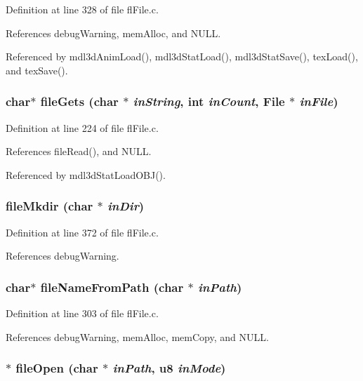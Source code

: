 Definition at line 328 of file fl\-File.c.

References debug\-Warning, mem\-Alloc, and NULL.

Referenced by mdl3d\-Anim\-Load(), mdl3d\-Stat\-Load(), mdl3d\-Stat\-Save(), tex\-Load(), and tex\-Save().
\subsubsection{\setlength{\rightskip}{0pt plus 5cm}char$\ast$ file\-Gets (char $\ast$ {\em in\-String}, int {\em in\-Count}, {\bf File} $\ast$ {\em in\-File})}\label{flFile_8h_2d7ffa40537f5f73b11830033ab1bad4}




Definition at line 224 of file fl\-File.c.

References file\-Read(), and NULL.

Referenced by mdl3d\-Stat\-Load\-OBJ().
\subsubsection{ file\-Mkdir (char $\ast$ {\em in\-Dir})}\label{flFile_8h_e477e900a835500927fc559f80c96136}




Definition at line 372 of file fl\-File.c.

References debug\-Warning.
\subsubsection{\setlength{\rightskip}{0pt plus 5cm}char$\ast$ file\-Name\-From\-Path (char $\ast$ {\em in\-Path})}\label{flFile_8h_fc44c878de74cd1411e468d2d68545c5}




Definition at line 303 of file fl\-File.c.

References debug\-Warning, mem\-Alloc, mem\-Copy, and NULL.
\subsubsection{$\ast$ file\-Open (char $\ast$ {\em in\-Path}, u8 {\em in\-Mode})}\label{flFile_8h_c93941480776a7835fc0b7eec7ebea85}




